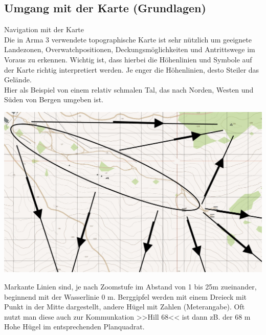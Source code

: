 \newpage

\subsection{Umgang mit der Karte (Grundlagen)}

	Navigation mit der Karte \\

	Die in Arma 3 verwendete topographische Karte ist sehr nützlich um geeignete Landezonen, Overwatchpositionen, Deckungsmöglichkeiten und Antrittswege im Voraus zu erkennen. Wichtig ist, dass hierbei die Höhenlinien und Symbole auf der Karte richtig interpretiert werden. Je enger die Höhenlinien, desto Steiler das Gelände. \\

 

	Hier als Beispiel von einem relativ schmalen Tal, das nach Norden, Westen und Süden von Bergen umgeben ist. \\
\begin{minipage}[t]{1\textwidth}
	\includegraphics[width=\textwidth]{./Grafiken/KarteUndMarkierungen/Karte1.png}
\end{minipage}

	Markante Linien sind, je nach Zoomstufe im Abstand von 1 bis 25m zueinander, beginnend mit der Wasserlinie 0 m. Berggipfel werden mit einem Dreieck mit Punkt in der Mitte dargestellt, andere Hügel mit Zahlen (Meterangabe). Oft nutzt man diese auch zur Kommunkation >>Hill 68<< ist dann zB. der 68 m Hohe Hügel im entsprechenden Planquadrat. \\

